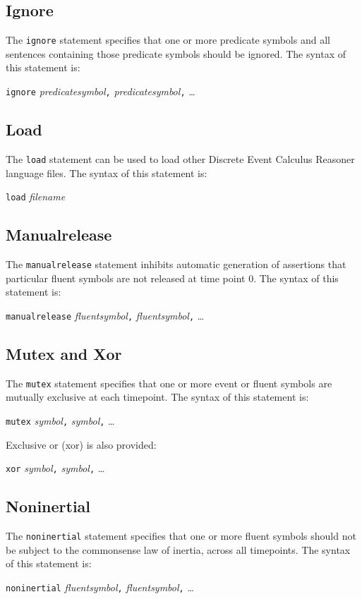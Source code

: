 \documentclass{article}
\begin{document}
\subsection{Ignore}
The {\tt ignore} statement specifies that one or more predicate symbols
and all sentences containing those predicate symbols should be ignored.
The syntax of this statement is:
\begin{flushleft}
{\tt ignore} {\em predicatesymbol}{\tt ,} {\em predicatesymbol}{\tt ,} \ldots
\end{flushleft}

\subsection{Load}
The {\tt load} statement can be used to load other Discrete Event Calculus
Reasoner language files. The syntax of this statement is:
\begin{flushleft}
{\tt load} {\em filename}
\end{flushleft}

\subsection{Manualrelease}
The {\tt manualrelease} statement inhibits automatic generation of
assertions that particular fluent symbols are not released at time
point 0. The syntax of this statement is:
\begin{flushleft}
{\tt manualrelease} {\em fluentsymbol}{\tt ,} {\em fluentsymbol}{\tt ,} \ldots
\end{flushleft}

\subsection{Mutex and Xor}
The {\tt mutex} statement specifies that one or more event or fluent
symbols are mutually exclusive at each timepoint. The syntax of this
statement is:
\begin{flushleft}
{\tt mutex} {\em symbol}{\tt ,} {\em symbol}{\tt ,} \ldots
\end{flushleft}
Exclusive or (xor) is also provided:
\begin{flushleft}
{\tt xor} {\em symbol}{\tt ,} {\em symbol}{\tt ,} \ldots
\end{flushleft}

\subsection{Noninertial}
The {\tt noninertial} statement specifies that one or more fluent symbols
should not be subject to the commonsense law of inertia, across all
timepoints. The syntax of this statement is:
\begin{flushleft}
{\tt noninertial} {\em fluentsymbol}{\tt ,} {\em fluentsymbol}{\tt ,} \ldots
\end{flushleft}
\end{document}

